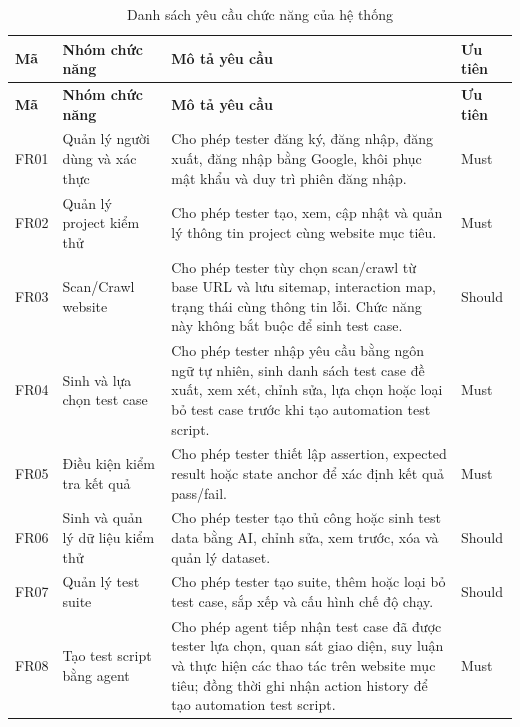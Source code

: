 {\small
\begin{longtable}{|p{1.5cm}|p{3.4cm}|p{8.1cm}|p{1.6cm}|}
\caption{Danh sách yêu cầu chức năng của hệ thống}
\label{tab:functional_requirements} \\
\hline
\textbf{Mã} &
\textbf{Nhóm chức năng} &
\textbf{Mô tả yêu cầu} &
\textbf{Ưu tiên} \\
\hline
\endfirsthead

\hline
\textbf{Mã} &
\textbf{Nhóm chức năng} &
\textbf{Mô tả yêu cầu} &
\textbf{Ưu tiên} \\
\hline
\endhead

FR01 &
Quản lý người dùng và xác thực &
Cho phép tester đăng ký, đăng nhập, đăng xuất, đăng nhập bằng Google, khôi phục mật khẩu và duy trì phiên đăng nhập. &
Must \\
\hline

FR02 &
Quản lý project kiểm thử &
Cho phép tester tạo, xem, cập nhật và quản lý thông tin project cùng website mục tiêu. &
Must \\
\hline

FR03 &
Scan/Crawl website &
Cho phép tester tùy chọn scan/crawl từ base URL và lưu sitemap, interaction map, trạng thái cùng thông tin lỗi. Chức năng này không bắt buộc để sinh test case. &
Should \\
\hline

FR04 &
Sinh và lựa chọn test case &
Cho phép tester nhập yêu cầu bằng ngôn ngữ tự nhiên, sinh danh sách test case đề xuất, xem xét, chỉnh sửa, lựa chọn hoặc loại bỏ test case trước khi tạo automation test script. &
Must \\
\hline

FR05 &
Điều kiện kiểm tra kết quả &
Cho phép tester thiết lập assertion, expected result hoặc state anchor để xác định kết quả pass/fail. &
Must \\
\hline

FR06 &
Sinh và quản lý dữ liệu kiểm thử &
Cho phép tester tạo thủ công hoặc sinh test data bằng AI, chỉnh sửa, xem trước, xóa và quản lý dataset. &
Should \\
\hline

FR07 &
Quản lý test suite &
Cho phép tester tạo suite, thêm hoặc loại bỏ test case, sắp xếp và cấu hình chế độ chạy. &
Should \\
\hline

FR08 &
Tạo test script bằng agent &
Cho phép agent tiếp nhận test case đã được tester lựa chọn, quan sát giao diện, suy luận và thực hiện các thao tác trên website mục tiêu; đồng thời ghi nhận action history để tạo automation test script. &
Must \\
\hline


\end{longtable}}
